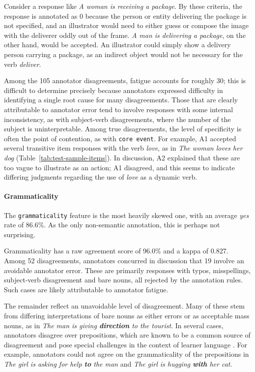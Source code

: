 \documentclass[11pt,a4paper]{article}
\newcommand{\feat}[1]{\texttt{#1}}
\begin{document}
Consider a response like \textit{A woman is receiving a package}.  By these criteria, the response is annotated as 0 because the person or entity delivering the package is not specified, and an illustrator would need to either guess or compose the image with the deliverer oddly out of the frame. \textit{A man is delivering a package}, on the other hand, would be accepted. An illustrator could simply show a delivery person carrying a package, as an indirect object would not be necessary for the verb \textit{deliver}.

Among the 105 annotator disagreements, fatigue accounts for roughly 30; this is difficult to determine precisely because annotators expressed difficulty in identifying a single root cause for many disagreements. Those that are clearly attributable to annotator error tend to involve responses with some internal inconsistency, as with subject-verb disagreements, where the number of the subject is uninterpretable. Among true disagreements, the level of specificity is often the point of contention, as with \feat{core event}. For example, A1 accepted several transitive item responses with the verb \textit{love}, as in \textit{The woman loves her dog} (Table~\ref{tab:test-sample-items}). In discussion, A2 explained that these are too vague to illustrate as an action; A1 disagreed, and this seems to indicate differing judgments regarding the use of \textit{love} as a dynamic verb.

\paragraph{Grammaticality} The \feat{grammaticality} feature is the most heavily skewed one, with an average \textit{yes} rate of 86.6\%.  As the only non-semantic annotation, this is perhaps not surprising.

Grammaticality has a raw agreement score of 96.0\% and a kappa of 0.827. Among 52 disagreements, annotators concurred in discussion that 19 involve an avoidable annotator error. These are primarily responses with typos, misspellings, subject-verb disagreement and bare nouns, all rejected by the annotation rules. Such cases are likely attributable to annotator fatigue.

The remainder reflect an unavoidable level of disagreement. Many of these stem from differing interpretations of bare nouns as either errors or as acceptable mass nouns, as in \textit{The man is giving \textbf{direction} to the tourist}. In several cases, annotators disagree over prepositions, which are known to be a common source of disagreement and pose special challenges in the context of learner language \citep{tetreault-chodorow:2008:HJCL,tetreault:chodorow:08}. For example, annotators could not agree on the grammaticality of the prepositions in \textit{The girl is asking for help \textbf{to} the man} and \textit{The girl is hugging \textbf{with} her cat}. 
\end{document}
